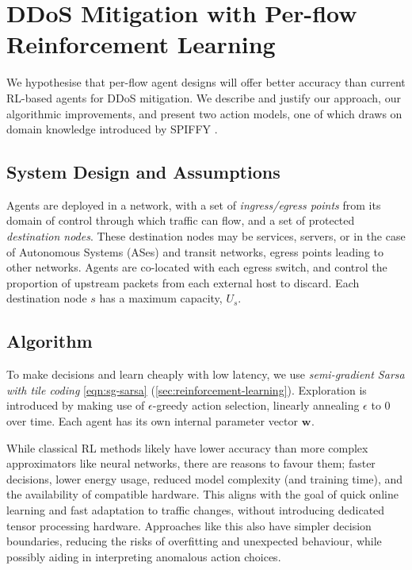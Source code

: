 \documentclass[10pt, times, conference, letterpaper]{IEEEtran}
\newcommand{\wvec}[1]{\ensuremath{\bm{w}_{#1}}}
\begin{document}
\section{DDoS Mitigation with Per-flow Reinforcement Learning}\label{sec:ddos-mitigation-with-per-flow-reinforcement-learning}
We hypothesise that per-flow agent designs will offer better accuracy than current RL-based agents for DDoS mitigation.
We describe and justify our approach, our algorithmic improvements, and present two action models, one of which draws on domain knowledge introduced by SPIFFY \cite{DBLP:conf/ndss/KangGS16}.

\subsection{System Design and Assumptions}
Agents are deployed in a network, with a set of \emph{ingress/egress points} from its domain of control through which traffic can flow, and a set of protected \emph{destination nodes}.
These destination nodes may be services, servers, or in the case of Autonomous Systems (ASes) and transit networks, egress points leading to other networks.
Agents are co-located with each egress switch, and control the proportion of upstream packets from each external host to discard.
Each destination node $s$ has a maximum capacity, $U_s$.

\subsection{Algorithm}
To make decisions and learn cheaply with low latency, we use \emph{semi-gradient Sarsa with tile coding} \ref{eqn:sg-sarsa} (\cref{sec:reinforcement-learning}).
Exploration is introduced by making use of $\epsilon$-greedy action selection, linearly annealing $\epsilon$ to 0 over time.
Each agent has its own internal parameter vector $\wvec{}$.

While classical RL methods likely have lower accuracy than more complex approximators like neural networks, there are reasons to favour them; faster decisions, lower energy usage, reduced model complexity (and training time), and the availability of compatible hardware.
This aligns with the goal of quick online learning and fast adaptation to traffic changes, without introducing dedicated tensor processing hardware.
Approaches like this also have simpler decision boundaries, reducing the risks of overfitting and unexpected behaviour, while possibly aiding in interpreting anomalous action choices.
\end{document}
